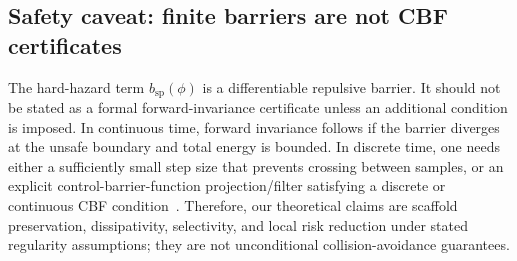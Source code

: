 \subsection{Safety caveat: finite barriers are not CBF certificates}
\label{app:safety_caveat}

The hard-hazard term \(b_{\mathrm{sp}}(\phi)\) is a differentiable repulsive barrier. It
should not be stated as a formal forward-invariance certificate unless an additional
condition is imposed. In continuous time, forward invariance follows if the barrier
diverges at the unsafe boundary and total energy is bounded. In discrete time, one
needs either a sufficiently small step size that prevents crossing between samples, or
an explicit control-barrier-function projection/filter satisfying a discrete or
continuous CBF condition~\citep{Ames2017CBF}. Therefore, our theoretical claims are
scaffold preservation, dissipativity, selectivity, and local risk reduction under stated
regularity assumptions; they are not unconditional collision-avoidance guarantees.
